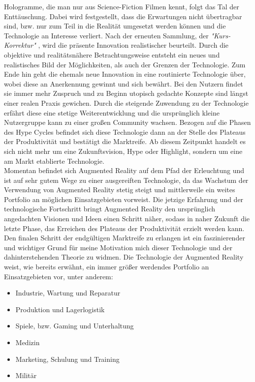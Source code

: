 Hologramme, die man nur aus Science-Fiction Filmen kennt, 
folgt das Tal der Enttäuschung. Dabei wird festgestellt, dass die Erwartungen nicht übertragbar sind, bzw. nur zum Teil in die Realität 
umgesetzt werden können und die Technologie an Interesse verliert. Nach der erneuten Sammlung, der \textit{"Kurs-Korrektur"} 
\cite{hypecycle.2019o}, wird die präsente Innovation realistischer beurteilt. 
Durch die objektive und realitätsnähere Betrachtungsweise entsteht ein neues und realistisches Bild der Möglichkeiten, als auch 
der Grenzen der Technologie. Zum Ende hin geht die ehemals neue Innovation in eine routinierte Technologie über, wobei diese an 
Anerkennung gewinnt und sich bewährt. Bei den Nutzern findet sie immer mehr Zuspruch und zu Beginn utopisch gedachte Konzepte sind
längst einer realen Praxis gewichen. Durch die steigende Zuwendung zu der Technologie erfährt diese eine stetige Weiterentwicklung
und die ursprünglich kleine Nutzergruppe kann zu einer großen Community wachsen. Bezogen auf die Phasen des Hype Cycles befindet sich diese 
Technologie dann an der Stelle des Plateaus der Produktivität und bestätigt die Marktreife. Ab diesem Zeitpunkt handelt es sich nicht mehr 
um eine Zukunftsvision, Hype oder Highlight, sondern um eine am Markt etablierte Technologie.
\\ 
\linebreak                                      %
Momentan befindet sich Augmented Reality auf dem Pfad der Erleuchtung und ist auf sehr gutem Wege zu einer ausgereiften Technologie, 
da das Wachstum der Verwendung von Augmented Reality stetig steigt und mittlerweile ein weites Portfolio an möglichen Einsatzgebieten 
vorweist. Die jetzige Erfahrung und der technologische Fortschritt bringt Augmented Reality den ursprünglich angedachten Visionen und Ideen 
einen Schritt näher, sodass in naher Zukunft die letzte Phase, das Erreichen des Plateaus der Produktivität erzielt werden kann. Den finalen 
Schritt der endgültigen Marktreife zu erlangen ist ein faszinierender und wichtiger Grund für meine Motivation mich dieser Technologie und 
der dahinterstehenden Theorie zu widmen. 
Die Technologie der Augmented Reality weist, wie bereits erwähnt, ein immer größer werdendes Portfolio an Einsatzgebieten vor, unter anderem: 
\begin{itemize}
    \item Industrie, Wartung und Reparatur
    \item Produktion und Lagerlogistik
    \item Spiele, bzw. Gaming und Unterhaltung
    \item Medizin
    \item Marketing, Schulung und Training %
    \item Militär
\end{itemize} 
